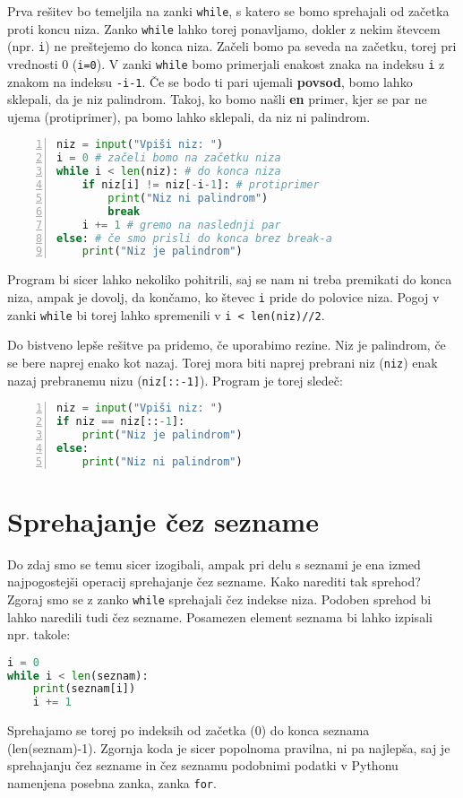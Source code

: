 \begin{resitev}
Prva rešitev bo temeljila na zanki \texttt{while}, s katero se bomo sprehajali od začetka proti koncu niza. Zanko \texttt{while} lahko torej ponavljamo, dokler z nekim števcem (npr. \texttt{i}) ne preštejemo do konca niza. Začeli bomo pa seveda na začetku, torej pri vrednosti 0 (\texttt{i=0}). V zanki \texttt{while} bomo primerjali enakost znaka na indeksu \texttt{i} z znakom na indeksu \texttt{-i-1}. Če se bodo ti pari ujemali \textbf{povsod}, bomo lahko sklepali, da je niz palindrom. Takoj, ko bomo našli \textbf{en} primer, kjer se par ne ujema (protiprimer), pa bomo lahko sklepali, da niz ni palindrom.
\begin{lstlisting}[language=Python,numbers=left]
niz = input("Vpiši niz: ")
i = 0 # začeli bomo na začetku niza
while i < len(niz): # do konca niza
    if niz[i] != niz[-i-1]: # protiprimer
        print("Niz ni palindrom")
        break
    i += 1 # gremo na naslednji par
else: # če smo prisli do konca brez break-a
    print("Niz je palindrom")
\end{lstlisting}
Program bi sicer lahko nekoliko pohitrili, saj se nam ni treba premikati do konca niza, ampak je dovolj, da končamo, ko števec \texttt{i} pride do polovice niza. Pogoj v zanki \texttt{while} bi torej lahko spremenili v \texttt{i < len(niz)//2}.

Do bistveno lepše rešitve pa pridemo, če uporabimo rezine. Niz je palindrom, če se bere naprej enako kot nazaj. Torej mora biti naprej prebrani niz (\texttt{niz}) enak nazaj prebranemu nizu (\texttt{niz[::-1]}). Program je torej sledeč:
\begin{lstlisting}[language=Python,numbers=left]
niz = input("Vpiši niz: ")
if niz == niz[::-1]:
    print("Niz je palindrom")
else:
    print("Niz ni palindrom")
\end{lstlisting}
\end{resitev}

\section{Sprehajanje čez sezname}
Do zdaj smo se temu sicer izogibali, ampak pri delu s seznami je ena izmed najpogostejši operacij sprehajanje čez sezname. Kako narediti tak sprehod? Zgoraj smo se z zanko \texttt{while} sprehajali čez indekse niza. Podoben sprehod bi lahko naredili tudi čez sezname. Posamezen element seznama bi lahko izpisali npr. takole:
\begin{lstlisting}[language=Python]
i = 0
while i < len(seznam):
    print(seznam[i])
    i += 1
\end{lstlisting}
Sprehajamo se torej po indeksih od začetka (0) do konca seznama (len(seznam)-1). Zgornja koda je sicer popolnoma pravilna, ni pa najlepša, saj je sprehajanju čez sezname in čez seznamu podobnimi podatki v Pythonu namenjena posebna zanka, zanka \texttt{for}.
